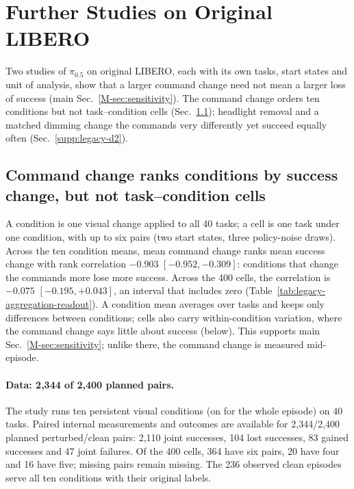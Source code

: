 \section{Further Studies on Original LIBERO}
\label{supp:legacy}
Two studies of $\pi_{0.5}$ on original LIBERO, each with its own tasks, start states and unit of analysis, show that a larger command change need not mean a larger loss of success (main Sec.~\ref*{M-sec:sensitivity}). The command change orders ten conditions but not task--condition cells (Sec.~\ref{supp:legacy-d3}); headlight removal and a matched dimming change the commands very differently yet succeed equally often (Sec.~\ref{supp:legacy-d2}).

\subsection{Command change ranks conditions by success change, but not task--condition cells}
\label{supp:legacy-d3}
A condition is one visual change applied to all 40 tasks; a cell is one task under one condition, with up to six pairs (two start states, three policy-noise draws). Across the ten condition means, mean command change ranks mean success change with rank correlation $-0.903$ $[-0.952,-0.309]$: conditions that change the commands more lose more success. Across the 400 cells, the correlation is $-0.075$ $[-0.195,+0.043]$, an interval that includes zero (Table~\ref{tab:legacy-aggregation-readout}). A condition mean averages over tasks and keeps only differences between conditions; cells also carry within-condition variation, where the command change says little about success (below). This supports main Sec.~\ref*{M-sec:sensitivity}; unlike there, the command change is measured mid-episode.

\paragraph{Data: 2,344 of 2,400 planned pairs.}
The study runs ten persistent visual conditions (on for the whole episode) on 40 tasks. Paired internal measurements and outcomes are available for 2,344/2,400 planned perturbed/clean pairs: 2,110 joint successes, 104 lost successes, 83 gained successes and 47 joint failures. Of the 400 cells, 364 have six pairs, 20 have four and 16 have five; missing pairs remain missing. The 236 observed clean episodes serve all ten conditions with their original labels.

